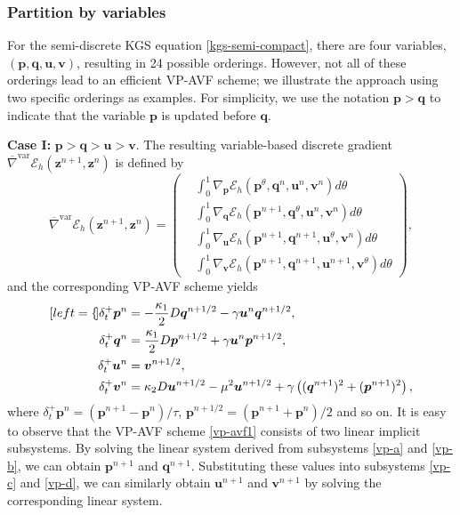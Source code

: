 \documentclass[fleqn,11pt]{elsarticle}
\numberwithin{equation}{section}
\begin{document}
\subsubsection{Partition by variables}

For the semi-discrete KGS equation \eqref{kgs-semi-compact}, there are four variables, $(\bm{p}, \bm{q}, \bm{u}, \bm{v})$, resulting in 24 possible orderings. However, not all of these orderings lead to an efficient VP-AVF scheme; we illustrate the approach using two specific orderings as examples. For simplicity, we use the notation $\bm{p} > \bm{q}$ to indicate that the variable $\bm{p}$ is updated before $\bm{q}$.

	{\bf Case I:} $\bm p>\bm q>\bm u>\bm v$. The resulting variable-based discrete gradient $\overline{\nabla}^{\text{var}}\mathcal{E}_h(\bm z^{n+1},\bm z^{n})$ is defined by
\begin{equation*}
	\overline{\nabla}^{\text{var}}\mathcal{E}_h(\bm z^{n+1},\bm z^{n})=\left(\begin{aligned}
			 & \int_0^1{\nabla}_{\bm p}\mathcal{E}_h(\bm p^{\theta},\bm q^n,\bm u^n,\bm v^n)d\theta             \\
			 & \int_0^1{\nabla}_{\bm q}\mathcal{E}_h(\bm p^{n+1},\bm q^{\theta},\bm u^n,\bm v^n)d\theta         \\
			 & \int_0^1{\nabla}_{\bm u}\mathcal{E}_h(\bm p^{n+1},\bm q^{n+1},\bm u^{\theta},\bm v^n)d\theta     \\
			 & \int_0^1{\nabla}_{\bm v}\mathcal{E}_h(\bm p^{n+1},\bm q^{n+1},\bm u^{n+1},\bm v^{\theta})d\theta
		\end{aligned}\right),
\end{equation*}
and the corresponding VP-AVF scheme yields
\begin{subequations}\label{vp-avf1}
	\begin{align}[left={\empheqlbrace}]\label{vp-a}
		\delta_t^+\bm p^{n} & =-\frac{\kappa_1}{2} D \bm q^{n+1/2} - \gamma \bm u^n \bm q^{n+1/2},                                     \\\label{vp-b}
		\delta_t^+\bm q^{n} & =\frac{\kappa_1}{2} D \bm p^{n+1/2} + \gamma \bm u^n \bm p^{n+1/2},                                      \\\label{vp-c}
		\delta_t^+\bm u^{n} & =\bm v^{n+1/2},                                                                                          \\\label{vp-d}
		\delta_t^+\bm v^{n} & =\kappa_2 D \bm u^{n+1/2} - \mu^2 \bm u^{n+1/2} + \gamma \left((\bm q^{n+1})^2 + (\bm p^{n+1})^2\right),
	\end{align}
\end{subequations}
where $\delta_t^+\bm p^n=(\bm p^{n+1}-\bm p^n)/\tau$, $\bm p^{n+1/2}=(\bm p^{n+1}+\bm p^n)/2$ and so on. It is easy to observe that the VP-AVF scheme \eqref{vp-avf1} consists of two linear implicit subsystems. By solving the linear system derived from subsystems \eqref{vp-a} and \eqref{vp-b}, we can obtain $\bm{p}^{n+1}$ and $\bm{q}^{n+1}$. Substituting these values into subsystems \eqref{vp-c} and \eqref{vp-d}, we can similarly obtain $\bm{u}^{n+1}$ and $\bm{v}^{n+1}$ by solving the corresponding linear system.
\end{document}
